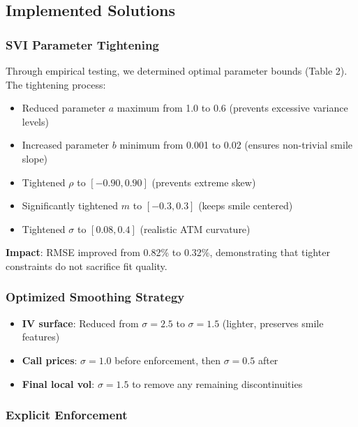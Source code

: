 \documentclass[12pt,a4paper]{article}
\begin{document}
\subsection{Implemented Solutions}

\subsubsection{SVI Parameter Tightening}\label{sec:svi_optimization}

Through empirical testing, we determined optimal parameter bounds (Table 2). The tightening process:

\begin{itemize}
    \item Reduced parameter $a$ maximum from 1.0 to 0.6 (prevents excessive variance levels)
    \item Increased parameter $b$ minimum from 0.001 to 0.02 (ensures non-trivial smile slope)
    \item Tightened $\rho$ to $[-0.90, 0.90]$ (prevents extreme skew)
    \item Significantly tightened $m$ to $[-0.3, 0.3]$ (keeps smile centered)
    \item Tightened $\sigma$ to $[0.08, 0.4]$ (realistic ATM curvature)
\end{itemize}

\textbf{Impact}: RMSE improved from 0.82\% to 0.32\%, demonstrating that tighter constraints do not sacrifice fit quality.

\subsubsection{Optimized Smoothing Strategy}

\begin{itemize}
    \item \textbf{IV surface}: Reduced from $\sigma=2.5$ to $\sigma=1.5$ (lighter, preserves smile features)
    \item \textbf{Call prices}: $\sigma=1.0$ before enforcement, then $\sigma=0.5$ after
    \item \textbf{Final local vol}: $\sigma=1.5$ to remove any remaining discontinuities
\end{itemize}

\subsubsection{Explicit Enforcement}
\end{document}
